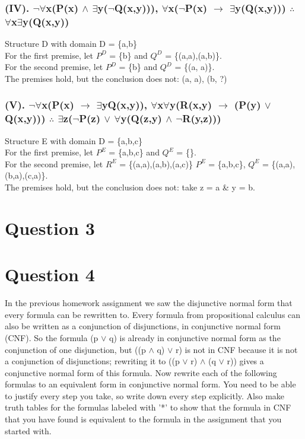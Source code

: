 \documentclass[a4paper]{article}
\begin{document}
\subsubsection{(IV). $\neg $$\forall $x(P(x) $\wedge $ $\exists $y($\neg $Q(x,y))), $\forall $x($\neg $P(x) $\rightarrow $ $\exists $y(Q(x,y))) $\therefore $ $\forall $x$\exists $y(Q(x,y))}
Structure D with domain D = \{a,b\}\\
For the first premise, let $P^D$ = \{b\} and $Q^D$ = \{(a,a),(a,b)\}.\\
For the second premise, let $P^D$ = \{b\} and $Q^D$ = \{(a, a)\}.\\
The premises hold, but the conclusion does not: (a, a), (b, ?)

\subsubsection{(V). $\neg $$\forall $x(P(x) $\rightarrow $ $\exists $yQ(x,y)), $\forall $x$\forall $y(R(x,y) $\rightarrow $ (P(y) $\vee $ Q(x,y))) $\therefore $ $\exists $z($\neg $P(z) $\vee $ $\forall $y(Q(z,y) $\wedge $ $\neg $R(y,z)))}
Structure E with domain D = \{a,b,c\}\\
For the first premise, let $P^E$ = \{a,b,c\} and $Q^E$ = \{\}.\\
For the second premise, let $R^E$ = \{(a,a),(a,b),(a,c)\} $P^E$ = \{a,b,c\}, $Q^E$ = \{(a,a),(b,a),(c,a)\}.\\
The premises hold, but the conclusion does not: take z = a \& y = b.

\newpage
\section{Question 3}

\newpage
\section{Question 4}
In the previous homework assignment we saw the disjunctive normal form that every formula can be
rewritten to. Every formula from propositional calculus can also be written as a conjunction of disjunctions,
in conjunctive normal form (CNF). So the formula (p $\vee $ q) is already in conjunctive normal form as the
conjunction of one disjunction, but ((p $\wedge $ q) $\vee $ r) is not in CNF because it is not a conjunction of
disjunctions; rewriting it to ((p $\vee $ r) $\wedge $ (q $\vee $ r)) gives a conjunctive normal form of this formula.
Now rewrite each of the following formulas to an equivalent form in conjunctive normal form. You need
to be able to justify every step you take, so write down every step explicitly. Also make truth tables for
the formulas labeled with '*' to show that the formula in CNF that you have found is equivalent to the
formula in the assignment that you started with.
\end{document}
